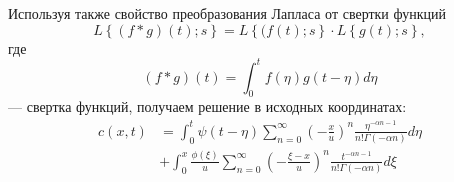 Используя также свойство преобразования Лапласа от свертки функций
\begin{equation}
	L\left\{\left(f * g\right) \left(t\right); s \right\} = L\left\{(f\left(t\right); s\right\} \cdot L\left\{g\left(t\right); s\right\},
\end{equation}
где
\begin{equation}
	\left(f * g\right) \left(t\right) = \int_0^t f\left(\eta\right) g\left(t - \eta\right) d \eta
\end{equation}
--- свертка функций, получаем решение в исходных координатах:
\begin{equation}
	\begin{split}
		c(x,t) & = \int_{0}^{t} \psi(t - \eta) \sum_{n=0}^\infty\left(-\frac{x}{u}\right)^n \frac{\eta^{-\alpha n - 1}}{n!\Gamma(-\alpha n)} d \eta\\
		& + \int_0^x \frac{\phi(\xi)}{u} \sum_{n=0}^\infty\left(-\frac{\xi-x}{u}\right)^n \frac{t^{-\alpha n - 1}}{n!\Gamma(-\alpha n)} d \xi\\
	\end{split}
\end{equation}

